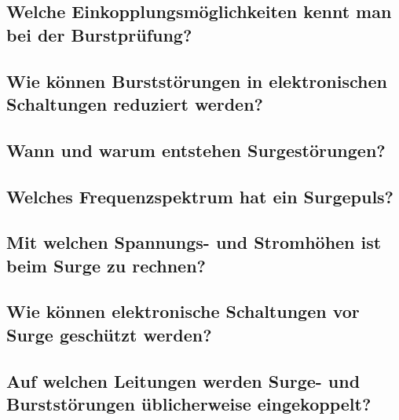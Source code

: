 \subsection{Welche Einkopplungsmöglichkeiten kennt man bei der Burstprüfung?}

\subsection{Wie können Burststörungen in elektronischen Schaltungen reduziert werden?}

\subsection{Wann und warum entstehen Surgestörungen?}

\subsection{Welches Frequenzspektrum hat ein Surgepuls?}

\subsection{Mit welchen Spannungs- und Stromhöhen ist beim Surge zu rechnen?}

\subsection{Wie können elektronische Schaltungen vor Surge geschützt werden?}

\subsection{Auf welchen Leitungen werden Surge- und Burststörungen üblicherweise eingekoppelt?}

\pagebreak
